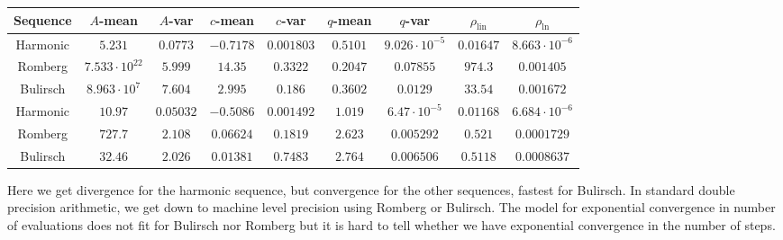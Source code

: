 \begin{table}[H]
    \centering
        \small
    \begin{tabular}{c||c|c|c|c|c|c|c|c}
Sequence & \(A\)-mean & \(A\)-var & \(c\)-mean & \(c\)-var & \(q\)-mean & \(q\)-var & \(\rho_{\operatorname{lin}}\) & \(\rho_{\ln}\)\\\hline
\rowcolor{red}
Harmonic & \(5.231\) & \(0.0773\) & \(-0.7178\) & \(0.001803\) & \(0.5101\) & \(9.026\cdot 10^{-5}\) & \(0.01647\) & \(8.663\cdot 10^{-6}\) \\
\rowcolor{red}
Romberg & \(7.533\cdot 10^{22}\) & \(5.999\) & \(14.35\) & \(0.3322\) & \(0.2047\) & \(0.07855\) & \(974.3\) & \(0.001405\) \\
\rowcolor{red}
Bulirsch & \(8.963\cdot 10^7\) & \(7.604\) & \(2.995\) & \(0.186\) & \(0.3602\) & \(0.0129\) & \(33.54\) & \(0.001672\) \\
\rowcolor{red}
Harmonic & \(10.97\) & \(0.05032\) & \(-0.5086\) & \(0.001492\) & \(1.019\) & \(6.47\cdot 10^{-5}\) & \(0.01168\) & \(6.684\cdot 10^{-6}\) \\
\rowcolor{yellow}
Romberg & \(727.7\) & \(2.108\) & \(0.06624\) & \(0.1819\) & \(2.623\) & \(0.005292\) & \(0.521\) & \(0.0001729\) \\
\rowcolor{yellow}
Bulirsch & \(32.46\) & \(2.026\) & \(0.01381\) & \(0.7483\) & \(2.764\) & \(0.006506\) & \(0.5118\) & \(0.0008637\) \\
    \end{tabular}
    \label{tab:my_label}
\end{table}

Here we get divergence for the harmonic sequence, but convergence for the other sequences, fastest for Bulirsch. In standard double precision arithmetic, we get down to machine level precision using Romberg or Bulirsch. The model for exponential convergence in number of evaluations does not fit for Bulirsch nor Romberg but it is hard to tell whether we have exponential convergence in the number of steps.

